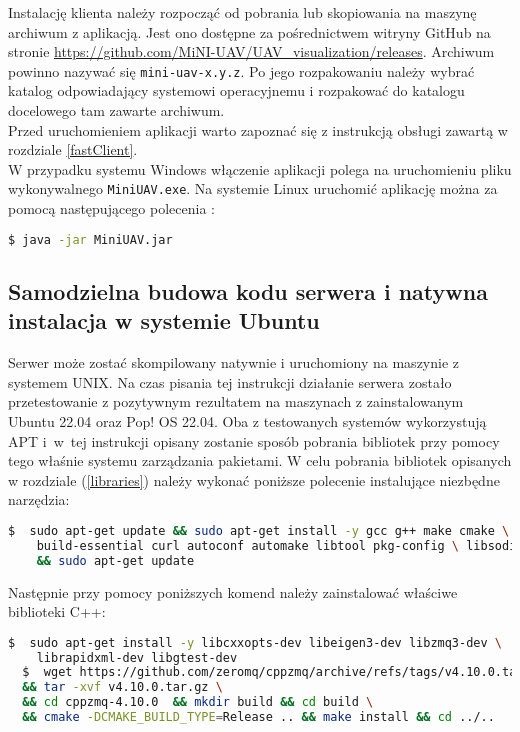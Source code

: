 Instalację klienta należy rozpocząć od pobrania lub skopiowania na maszynę archiwum z aplikacją. Jest ono dostępne za pośrednictwem witryny GitHub na stronie \url{https://github.com/MiNI-UAV/UAV\_visualization/releases}. Archiwum powinno nazywać się \texttt{mini-uav-x.y.z}. Po jego rozpakowaniu należy wybrać katalog odpowiadający systemowi operacyjnemu i rozpakować do katalogu docelowego tam zawarte archiwum. \\

Przed uruchomieniem aplikacji warto zapoznać się z instrukcją obsługi zawartą w rozdziale \ref{fastClient}. \\

W przypadku systemu Windows włączenie aplikacji polega na uruchomieniu pliku wykonywalnego \texttt{MiniUAV.exe}. Na systemie Linux uruchomić aplikację można za pomocą następującego polecenia :

\begin{lstlisting}[language=bash]
  $ java -jar MiniUAV.jar
\end{lstlisting}

\subsection{Samodzielna budowa kodu serwera i natywna instalacja w systemie Ubuntu}

Serwer może zostać skompilowany natywnie i uruchomiony na maszynie z systemem UNIX. Na czas pisania tej instrukcji działanie serwera zostało przetestowanie z pozytywnym rezultatem na maszynach z zainstalowanym Ubuntu 22.04 oraz Pop! OS 22.04. Oba z testowanych systemów wykorzystują APT i~w~tej instrukcji opisany zostanie sposób pobrania bibliotek przy pomocy tego właśnie systemu zarządzania pakietami. W celu pobrania bibliotek opisanych w rozdziale (\ref{libraries}) należy wykonać poniższe polecenie instalujące niezbędne narzędzia:
\begin{lstlisting}[language=bash]
  $  sudo apt-get update && sudo apt-get install -y gcc g++ make cmake \ 
	build-essential curl autoconf automake libtool pkg-config \ libsodium-dev wget gitlibx11-dev software-properties-common \ 
	&& sudo apt-get update 
\end{lstlisting}

Następnie przy pomocy poniższych komend należy zainstalować właściwe biblioteki C++:
\begin{lstlisting}[language=bash]
  $  sudo apt-get install -y libcxxopts-dev libeigen3-dev libzmq3-dev \
	librapidxml-dev libgtest-dev 
  $  wget https://github.com/zeromq/cppzmq/archive/refs/tags/v4.10.0.tar.gz \
  && tar -xvf v4.10.0.tar.gz \
  && cd cppzmq-4.10.0  && mkdir build && cd build \
  && cmake -DCMAKE_BUILD_TYPE=Release .. && make install && cd ../..
\end{lstlisting}

